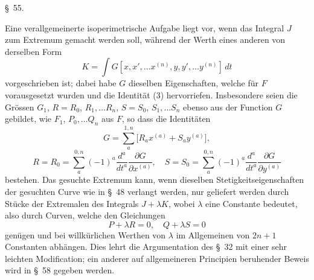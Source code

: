 \documentclass[11pt,a4paper,leqno]{article}
\begin{document}
\begin{center}
{\large \S~55.}
\end{center}

Eine verallgemeinerte isoperimetrische Aufgabe liegt vor, wenn das Integral $J$ zum Extremum gemacht werden soll, während der Werth eines anderen von derselben Form
\[
K=\int G[x,x',\ldots x^{(n)},y,y',\ldots y^{(n)}]\,dt
\]
vorgeschrieben ist; dabei habe $G$ dieselben Eigenschaften, welche für $F$ vorausgesetzt wurden und die Identität (3) hervorriefen. Insbesondere seien die Grössen $G_1$, $R=R_0$, $R_1,\ldots R_n$, $S=S_0$, $S_1,\ldots S_n$ ebenso aus der Function $G$ gebildet, wie $F_1$, $P_0,\ldots Q_n$ aus $F$, so dass die Identitäten
\[
G=\sum_a^{1,n}\bigl[R_ax^{(a)}+S_ay^{(a)}\bigr],
\]
\[
R=R_0=\sum_a^{0,n}(-1)^a\frac{d^a}{dt^a}\frac{\partial G}{\partial x^{(a)}},
\quad
S=S_0=\sum_a^{0,n}(-1)^a\frac{d^a}{dt^a}\frac{\partial G}{\partial y^{(a)}}
\]
bestehen. Das gesuchte Extremum kann, wenn dieselben Stetigkeitseigenschaften der gesuchten Curve wie in \S~48 verlangt werden, nur geliefert werden durch Stücke der Extremalen des Integrals $J+\lambda K$, wobei $\lambda$ eine Constante bedeutet, also durch Curven, welche den Gleichungen
\[
P+\lambda R=0,\quad Q+\lambda S=0
\]
genügen und bei willkürlichen Werthen von $\lambda$ im Allgemeinen von $2n+1$ Constanten abhängen. Dies lehrt die Argumentation des \S~32 mit einer sehr leichten Modification; ein anderer auf allgemeineren Principien beruhender Beweis wird in \S~58 gegeben werden.
\end{document}
